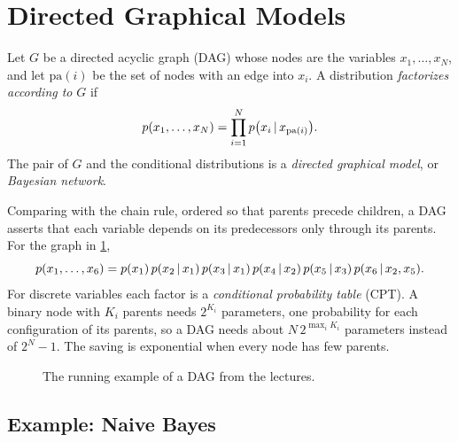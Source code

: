 \section{Directed Graphical Models}\label{sec:dag}

\begin{definition}\label{def:dagm}
Let $G$ be a directed acyclic graph (DAG) whose nodes are the variables $x_1,\dots,x_N$, and let $\mathrm{pa}(i)$ be the set of nodes with an edge into $x_i$. A distribution \emph{factorizes according to} $G$ if
\[
p(x_1,\dots,x_N)=\prod_{i=1}^Np\big(x_i\,|\, x_{\mathrm{pa}(i)}\big).
\]
The pair of $G$ and the conditional distributions is a \emph{directed graphical model}, or \emph{Bayesian network}.
\end{definition}

Comparing with the chain rule, ordered so that parents precede children, a DAG asserts that each variable depends on its predecessors only through its parents. For the graph in \cref{fig:dag6},
\[
p(x_1,\dots,x_6)=p(x_1)\,p(x_2\,|\, x_1)\,p(x_3\,|\, x_1)\,p(x_4\,|\, x_2)\,p(x_5\,|\, x_3)\,p(x_6\,|\, x_2,x_5).
\]
For discrete variables each factor is a \emph{conditional probability table} (CPT). A binary node with $K_i$ parents needs $2^{K_i}$ parameters, one probability for each configuration of its parents, so a DAG needs about $N\,2^{\max_iK_i}$ parameters instead of $2^N-1$. The saving is exponential when every node has few parents.

\begin{figure}[ht]
\centering
{}
\caption{The running example of a DAG from the lectures.}
\label{fig:dag6}
\end{figure}

\subsection{Example: Naive Bayes}

